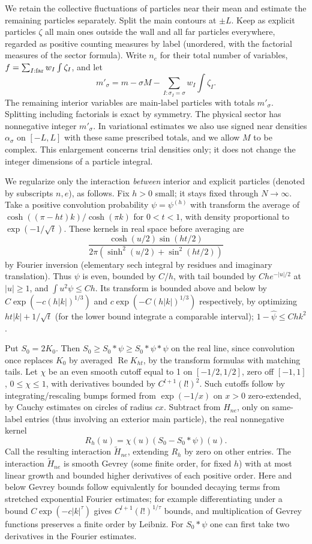 We retain the collective fluctuations of particles near their mean and
estimate the remaining particles separately. Split the main contours
at \(\pm L\). Keep as explicit particles \(\zeta\) all main ones outside the wall and all far particles everywhere, regarded as positive counting measures by label (unordered, with the factorial measures of the sector formula). Write \(n_e\) for their total number of variables, \(f=\sum_{I:\rm far}w_I\int\zeta_I\), and let
\[
 m'_\sigma=m-\sigma M-\sum_{I:\sigma_I=\sigma}w_I\int\zeta_I .
\]
The remaining interior variables are main-label particles with totals \(m'_\sigma\). Splitting including factorials is exact by symmetry. The physical sector has nonnegative integer \(m'_\sigma\). In
variational estimates we also use signed near densities
\(\alpha_\sigma\) on \([-L,L]\) with these same prescribed totals,
and we allow \(M\) to be complex. This enlargement concerns trial
densities only; it does not change the integer dimensions of a particle
integral.

We regularize only the interaction \emph{between} interior and explicit particles (denoted by subscripts \(n,e\)), as follows. Fix \(h>0\) small; it stays fixed through \(N\to\infty\). Take a positive convolution probability \(\psi=\psi^{(h)}\) with transform the average of
\(\cosh((\pi-ht)k)/\cosh(\pi k)\) for \(0<t<1\), with density proportional to \(\exp(-1/\sqrt t)\). These kernels in real space before averaging are
\[
 \frac{\cosh(u/2)\sin(ht/2)}{2\pi(\sinh^2(u/2)+\sin^2(ht/2))}
\]
by Fourier inversion (elementary sech integral by residues and imaginary translation). Thus \(\psi\) is even, bounded by \(C/h\), with tail bounded by \(C h e^{-|u|/2}\) at \(|u|\ge1\), and \(\int u^2\psi\le C h\). Its transform is bounded above and below by \(C\exp(-c(h|k|)^{1/3})\) and \(c\exp(-C(h|k|)^{1/3})\) respectively, by optimizing \(ht|k|+1/\sqrt t\) (for the lower bound integrate a comparable interval); \(1-\widehat\psi\le Ch k^2\).

Put \(S_0=2K_0\). Then \(S_0\ge S_0*\psi\ge S_0*\psi*\psi\) on the real line, since convolution once replaces \(K_0\) by averaged \(\operatorname{Re}K_{ht}\), by the transform formulas with matching tails. Let \(\chi\) be an even smooth cutoff equal to 1 on \([-1/2,1/2]\), zero off \([-1,1]\), \(0\le\chi\le1\), with derivatives bounded by \(C^{l+1}(l!)^2\). Such cutoffs follow by integrating/rescaling bumps formed from \(\exp(-1/x)\) on \(x>0\) zero-extended, by Cauchy estimates on circles of radius \(c x\). Subtract from \(H_{ne}\), only on same-label entries (thus involving an exterior main particle), the real nonnegative kernel
\[
 R_h(u)=\chi(u)(S_0-S_0*\psi)(u).
\]
Call the resulting interaction \(\widetilde H_{ne}\), extending \(R_h\) by zero on other entries. The interaction \(\widetilde H_{ne}\) is smooth Gevrey (some finite order, for fixed \(h\)) with at most linear growth and bounded higher derivatives of each positive order. Here and below Gevrey bounds follow equivalently for bounded decaying terms from stretched exponential Fourier estimates; for example differentiating under a bound \(C\exp(-c|k|^\tau)\) gives \(C^{l+1}(l!)^{1/\tau}\) bounds, and multiplication of Gevrey functions preserves a finite order by Leibniz. For \(S_0*\psi\) one can first take two derivatives in the Fourier estimates.

